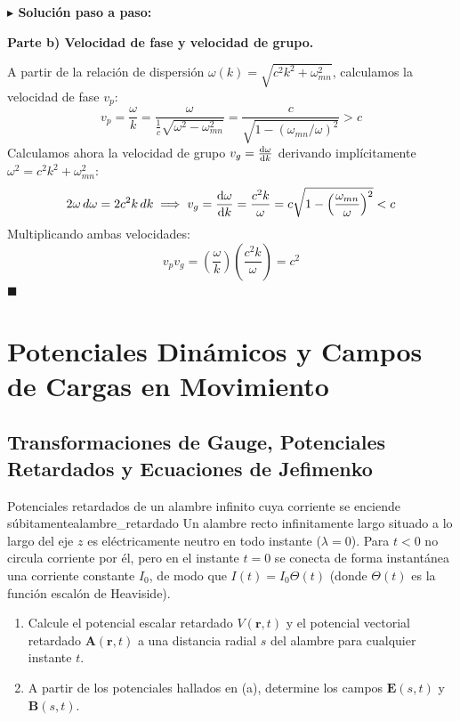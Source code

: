 \documentclass[11pt,a4paper]{book}
\newenvironment{solucion}{%
    \par\medskip\noindent\textbf{\color{blue!65!black}\Large $\blacktriangleright$ Solución paso a paso:}\par\medskip
}{%
    \hfill$\blacksquare$\par\bigskip
}
\newcommand{\Evec}{\bm{E}}
\newcommand{\Bvec}{\bm{B}}
\newcommand{\Avec}{\bm{A}}
\begin{document}
\begin{solucion}
\medskip
\textbf{Parte b) Velocidad de fase y velocidad de grupo.}

A partir de la relación de dispersión $\omega(k) = \sqrt{c^2 k^2 + \omega_{mn}^2}$, calculamos la velocidad de fase $v_p$:
\begin{equation}
    v_p = \frac{\omega}{k} = \frac{\omega}{\frac{1}{c}\sqrt{\omega^2 - \omega_{mn}^2}} = \frac{c}{\sqrt{1 - (\omega_{mn}/\omega)^2}} > c
\end{equation}
Calculamos ahora la velocidad de grupo $v_g = \dv{\omega}{k}$ derivando implícitamente $\omega^2 = c^2 k^2 + \omega_{mn}^2$:
\begin{equation}
    2\omega\,d\omega = 2c^2 k\,dk \implies v_g = \dv{\omega}{k} = \frac{c^2 k}{\omega} = c\sqrt{1 - \left(\frac{\omega_{mn}}{\omega}\right)^2} < c
\end{equation}
Multiplicando ambas velocidades:
\begin{equation}
    v_p v_g = \left(\frac{\omega}{k}\right)\left(\frac{c^2 k}{\omega}\right) = c^2
\end{equation}
\end{solucion}

\chapter{Potenciales Dinámicos y Campos de Cargas en Movimiento}

\section[Gauge y potenciales retardados]{Transformaciones de Gauge, Potenciales Retardados y Ecuaciones de Jefimenko}

\begin{ejercicio}{Potenciales retardados de un alambre infinito cuya corriente se enciende súbitamente}{alambre_retardado}
Un alambre recto infinitamente largo situado a lo largo del eje $z$ es eléctricamente neutro en todo instante ($\lambda = 0$). Para $t < 0$ no circula corriente por él, pero en el instante $t = 0$ se conecta de forma instantánea una corriente constante $I_0$, de modo que $I(t) = I_0 \Theta(t)$ (donde $\Theta(t)$ es la función escalón de Heaviside).
\begin{enumerate}[label=\alph*)]
    \item Calcule el potencial escalar retardado $V(\bm{r},t)$ y el potencial vectorial retardado $\Avec(\bm{r},t)$ a una distancia radial $s$ del alambre para cualquier instante $t$.
    \item A partir de los potenciales hallados en (a), determine los campos $\Evec(s,t)$ y $\Bvec(s,t)$.
\end{enumerate}
\end{ejercicio}
\end{document}
